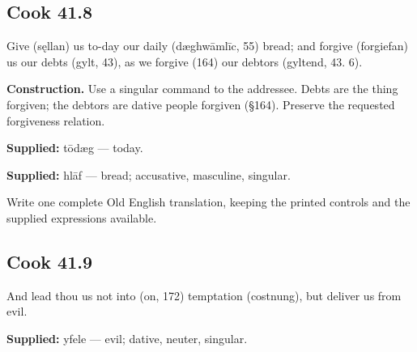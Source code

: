 \par\begin{minipage}{\linewidth}\raggedright
\subsection*{Cook 41.8}

Give (sęllan) us to-day our daily (dæghwāmlīc, 55) bread; and forgive (forgiefan) us our debts (gylt, 43), as we forgive (164) our debtors (gyltend, 43. 6).

\textbf{Construction.} Use a singular command to the addressee. Debts are the thing forgiven; the debtors are dative people forgiven (§164). Preserve the requested forgiveness relation.

\end{minipage}\par\addvspace{4pt}

\textbf{Supplied:} tōdæg — today.

\textbf{Supplied:} hlāf — bread; accusative, masculine, singular.

Write one complete Old English translation, keeping the printed controls and the supplied expressions available.

\par\begin{minipage}{\linewidth}\raggedright
\subsection*{Cook 41.9}

And lead thou us not into (on, 172) temptation (costnung), but deliver us from evil.

\end{minipage}\par\addvspace{4pt}

\textbf{Supplied:} yfele — evil; dative, neuter, singular.

